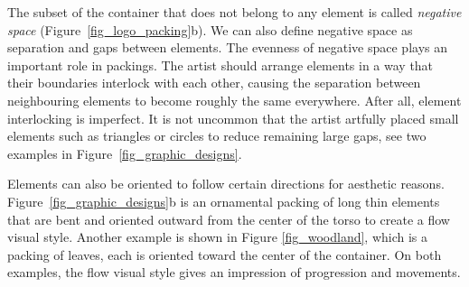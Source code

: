 \newtext
{
The subset of the container that does not belong to any element is
called \textit{negative space} (Figure~\ref{fig_logo_packing}b).
We can also define negative space as separation and gaps between elements.
The evenness of negative space plays an important role in  packings.  
The artist should arrange elements in a way that their boundaries interlock with each other,
causing the separation between neighbouring elements to become roughly the same everywhere.
After all, element interlocking is imperfect. It is not uncommon that 
the artist artfully placed small elements such as triangles or circles to reduce remaining large gaps,
see two examples in Figure~\ref{fig_graphic_designs}.
}


\newtext
{
Elements can also be oriented to follow certain directions for aesthetic reasons.
Figure~\ref{fig_graphic_designs}b is an ornamental packing
of long thin elements that are bent and oriented outward from the center of the torso to create a flow visual style.
Another example is shown in Figure \ref{fig_woodland}, which is a packing of leaves, each is oriented toward the center of the container.
On both examples, the flow visual style gives an impression of progression and movements.}

